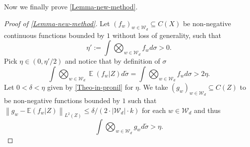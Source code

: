 \documentclass[letter,11pt]{article}
\theoremstyle{definition}
\newcommand{\E}{\mathbb{E}}
\newcommand{\bE}{\mathop{\mathbb{E}}}
\newcommand{\norm}[1]{\left\lVert#1\right\rVert}
\begin{document}
Now we finally prove \cref{Lemma-new-method}.
\begin{proof}[Proof of \cref{Lemma-new-method}]
Let $(f_w)_{w\in \mathcal{W}_d}\subseteq C(X)$ be non-negative continuous functions bounded by $1$ without loss of generality, such that 
\begin{equation*}
         \eta':=\int  \bigotimes_{w\in\mathcal{W}_d} f_{w} d \sigma >0.
\end{equation*}
Pick $\eta\in (0,\eta'/2)  $ and notice that by definition of $\sigma$
\begin{equation*}
         \int \bigotimes_{w\in\mathcal{W}_d} \bE(f_{w}|Z)d\tilde{\sigma}= \int  \bigotimes_{w\in\mathcal{W}_d} f_{w} d\sigma>2\eta.
\end{equation*}
Let $0<\delta<\eta$ given by \cref{Theo-in-pronil} for $\eta$. We take $(g_w)_{w\in \mathcal{W}_d}\subseteq C(Z)$ to be non-negative functions bounded by $1$ such that $\norm{g_w-\E(f_w|Z)}_{L^2(Z)}\leq \delta/(2\cdot |\mathcal{W}_d|\cdot k)$ for each $w\in \mathcal{W}_d$ and thus
\begin{equation*}
       \int \bigotimes_{w\in\mathcal{W}_d} g_{w}d\tilde{\sigma}>\eta.
\end{equation*}


\end{proof}
\end{document}

